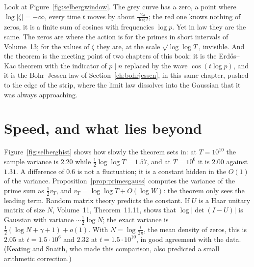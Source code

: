 \begin{beauty}
Look at Figure~\ref{fig:selbergwindow}. The grey curve has a zero, a point where $\log|\zeta|=-\infty$, every time $t$ moves by about $\frac{2\pi}{\log t}$; the red one knows nothing of zeros, it is a finite sum of cosines with frequencies $\log p$. Yet in law they are the same. The zeros are where the action is for the primes in short intervals of Volume~13; for the values of $\zeta$ they are, at the scale $\sqrt{\log\log T}$, invisible. And the theorem is the meeting point of two chapters of this book: it is the Erd\H{o}s--Kac theorem with the indicator of $p\mid n$ replaced by the wave $\cos(t\log p)$, and it is the Bohr--Jessen law of Section~\ref{ch:bohrjessen}, in this same chapter, pushed to the edge of the strip, where the limit law dissolves into the Gaussian that it was always approaching.
\end{beauty}

\section{Speed, and what lies beyond}

Figure~\ref{fig:selberghist} shows how slowly the theorem sets in: at $T=10^{10}$ the sample variance is $2.20$ while $\frac12\log\log T=1.57$, and at $T=10^6$ it is $2.00$ against $1.31$. A difference of $0.6$ is not a fluctuation; it is a constant hidden in the $O(1)$ of the variance. Proposition~\ref{prop:primesgauss} computes the variance of the prime sum as $\frac12v_T$, and $v_T=\log\log T+O(\log W)$: the theorem only sees the leading term. Random matrix theory predicts the constant. If $U$ is a Haar unitary matrix of size $N$, Volume~11, Theorem~11.11, shows that $\log|\det(I-U)|$ is Gaussian with variance $\sim\frac12\log N$; the exact variance is $\frac12(\log N+\gamma+1)+o(1)$. With $N=\log\frac t{2\pi}$, the mean density of zeros, this is $2.05$ at $t=1.5\cdot10^6$ and $2.32$ at $t=1.5\cdot10^{10}$, in good agreement with the data. (Keating and Snaith, who made this comparison, also predicted a small arithmetic correction.)

